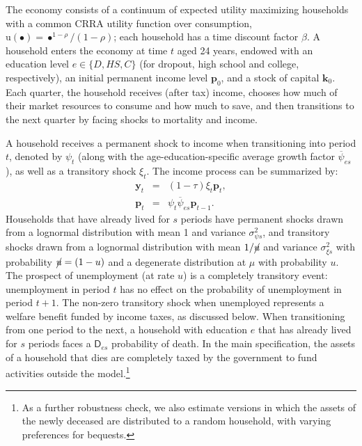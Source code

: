 \documentclass{econtex}\usepackage[pdftex]{graphicx}\usepackage{epstopdf} \usepackage[pdftex]{hyperref}
\newcommand{\CRRA}{\ensuremath{\rho}}
\newcommand{\Discount}{\ensuremath{\beta}}
\newcommand{\erate}{\ensuremath{\cancel{\urate}}}
\newcommand{\kLev}{\ensuremath{\pmb{k}}}
\newcommand{\PDies}{\ensuremath{\mathsf{D}}}
\newcommand{\pLev}{\ensuremath{\pmb{p}}}
\newcommand{\pshk}{\psi} %
\newcommand{\tshk}{\xi} %
\newcommand{\urate}{\ensuremath{u}}
\newcommand{\util}{{\ensuremath{\mathrm{u}}}}
\newcommand{\yLev}{\ensuremath{\pmb{y}}}
\begin{document}
The economy consists of a continuum of expected utility maximizing households with a common CRRA utility function over consumption, $\util(\bullet) = \bullet^{1-\CRRA}/(1-\CRRA)$; each household has a time discount factor $\Discount$.  A household enters the economy at time $t$ aged 24 years, endowed with an education level $e \in \{D,HS,C\}$ (for dropout, high school and college, respectively), an initial permanent income level $\pLev_0$, and a stock of capital $\kLev_0$.  Each quarter, the household receives (after tax) income, chooses how much of their market resources to consume and how much to save, and then transitions to the next quarter by facing shocks to mortality and income.

A household receives a permanent shock to income when transitioning into period $t$, denoted by $\pshk_t$ (along with the age-education-specific average growth factor $\overline{\pshk}_{es}$), as well as a transitory shock $\tshk_t$.  The income process can be summarized by:
\begin{eqnarray*}
\yLev_t &=& (1 - \tau) \tshk_t \pLev_t,\\
\pLev_t &=& \pshk_t \overline{\pshk}_{es} \pLev_{t-1}.
\end{eqnarray*}
Households that have already lived for $s$ periods have permanent shocks drawn from a lognormal distribution with mean 1 and variance $\sigma^2_{\pshk s}$, and transitory shocks drawn from a lognormal distribution with mean $1/\erate$ and variance $\sigma^2_{\tshk s}$ with probability $\erate = (1 - \urate)$ and a degenerate distribution at $\mu$ with probability $\urate$.  The prospect of unemployment (at rate $\urate$) is a completely transitory event: unemployment in period $t$ has no effect on the probability of unemployment in period $t + 1$.  The non-zero transitory shock when unemployed represents a welfare benefit funded by income taxes, as discussed below.  When transitioning from one period to the next, a household with education $e$ that has already lived for $s$ periods faces a $\PDies_{es}$ probability of death.  In the main specification, the assets of a household that dies are completely taxed by the government to fund activities outside the model.\footnote{As a further robustness check, we also estimate versions in which the assets of the newly deceased are distributed to a random household, with varying preferences for bequests.}
\end{document}
